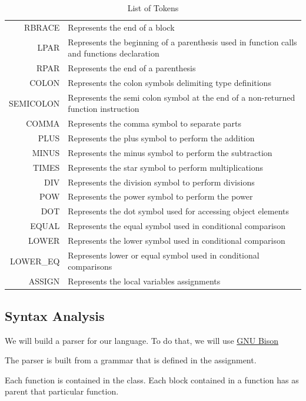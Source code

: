 \documentclass[a4paper,11pt]{article}
\begin{document}
\begin{table}[hp]
\begin{tabular}{|r|p{10cm}|}
      RBRACE& Represents the end of a block\\
      LPAR & Represents the beginning of a parenthesis used in function calls and functions declaration\\
      RPAR & Represents the end of a parenthesis\\
      COLON & Represents the colon symbols delimiting type definitions\\
      SEMICOLON & Represents the semi colon symbol at the end of a non-returned function instruction \\
      COMMA & Represents the comma symbol to separate parts \\
      PLUS & Represents the plus symbol to perform the addition\\
      MINUS & Represents the minus symbol to perform the subtraction\\
      TIMES & Represents the star symbol to perform multiplications\\
      DIV & Represents the division symbol to perform divisions\\
      POW & Represents the power symbol to perform the power\\
      DOT & Represents the dot symbol used for accessing object elements\\
      EQUAL & Represents the equal symbol used in conditional comparison\\
      LOWER & Represents the lower symbol used in conditional comparison\\
      LOWER\_EQ & Represents lower or equal symbol used in conditional comparisons\\
      ASSIGN & Represents the local variables assignments\\
      \hline
      \end{tabular}
      \caption{List of Tokens\label{tab:listToken}}
    \end{table}

\subsection{Syntax Analysis}
  \label{sec:syntax}
  We will build a parser for our language. To do that, we will use \href{https://www.gnu.org/software/bison/}{GNU Bison} 

  The parser is built from a grammar that is defined in the assignment.

  Each function is contained in the class. Each block contained in a function has as parent that particular function.
\end{document}
